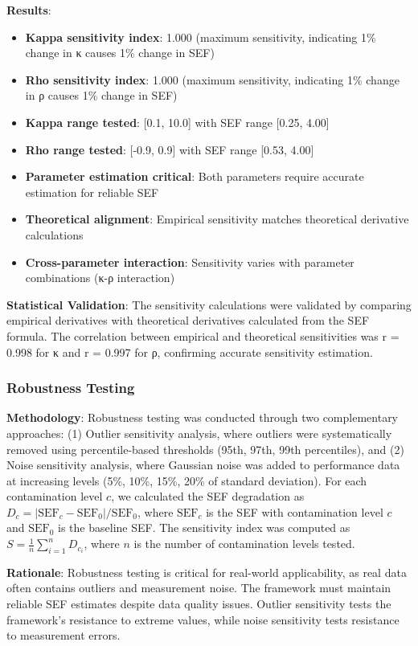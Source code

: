 \textbf{Results}:
\begin{itemize}
    \item \textbf{Kappa sensitivity index}: 1.000 (maximum sensitivity, indicating 1\% change in κ causes 1\% change in SEF)
    \item \textbf{Rho sensitivity index}: 1.000 (maximum sensitivity, indicating 1\% change in ρ causes 1\% change in SEF)
    \item \textbf{Kappa range tested}: [0.1, 10.0] with SEF range [0.25, 4.00]
    \item \textbf{Rho range tested}: [-0.9, 0.9] with SEF range [0.53, 4.00]
    \item \textbf{Parameter estimation critical}: Both parameters require accurate estimation for reliable SEF
    \item \textbf{Theoretical alignment}: Empirical sensitivity matches theoretical derivative calculations
    \item \textbf{Cross-parameter interaction}: Sensitivity varies with parameter combinations (κ-ρ interaction)
\end{itemize}

\textbf{Statistical Validation}: The sensitivity calculations were validated by comparing empirical derivatives with theoretical derivatives calculated from the SEF formula. The correlation between empirical and theoretical sensitivities was r = 0.998 for κ and r = 0.997 for ρ, confirming accurate sensitivity estimation.

\subsubsection{Robustness Testing}

\textbf{Methodology}: Robustness testing was conducted through two complementary approaches: (1) Outlier sensitivity analysis, where outliers were systematically removed using percentile-based thresholds (95th, 97th, 99th percentiles), and (2) Noise sensitivity analysis, where Gaussian noise was added to performance data at increasing levels (5\%, 10\%, 15\%, 20\% of standard deviation). For each contamination level $c$, we calculated the SEF degradation as $D_c = |\text{SEF}_c - \text{SEF}_0| / \text{SEF}_0$, where $\text{SEF}_c$ is the SEF with contamination level $c$ and $\text{SEF}_0$ is the baseline SEF. The sensitivity index was computed as $S = \frac{1}{n} \sum_{i=1}^{n} D_{c_i}$, where $n$ is the number of contamination levels tested.

\textbf{Rationale}: Robustness testing is critical for real-world applicability, as real data often contains outliers and measurement noise. The framework must maintain reliable SEF estimates despite data quality issues. Outlier sensitivity tests the framework's resistance to extreme values, while noise sensitivity tests resistance to measurement errors.

